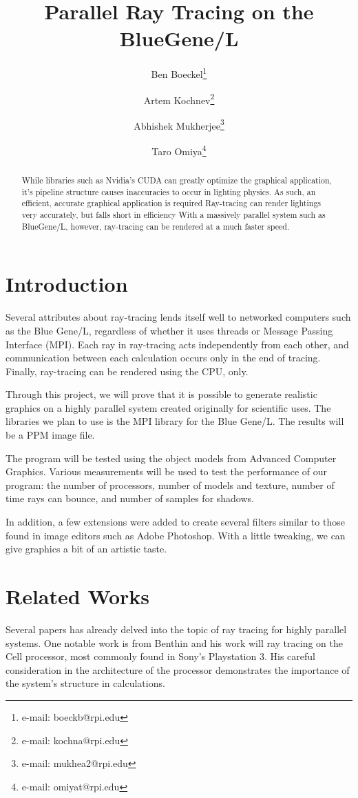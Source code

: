 \documentclass{acmsiggraph}
\title{Parallel Ray Tracing on the BlueGene/L}
\author{%
Ben Boeckel\thanks{e-mail: boeckb@rpi.edu} %
\and Artem Kochnev\thanks{e-mail: kochna@rpi.edu} %
\and Abhishek Mukherjee\thanks{e-mail: mukhea2@rpi.edu} %
\and Taro Omiya\thanks{e-mail: omiyat@rpi.edu}}
\begin{document}
\maketitle


\begin{abstract}
While libraries such as Nvidia's CUDA can greatly optimize the graphical
application, it's pipeline structure causes inaccuracies to occur in lighting
physics.  As such, an efficient, accurate graphical application is required
Ray-tracing can render lightings very accurately, but falls short in efficiency
With a massively parallel system such as BlueGene/L, however, ray-tracing can be
rendered at a much faster speed.
\end{abstract}
\keywordlist


\section{Introduction}
Several attributes about ray-tracing lends itself well to networked computers
such as the Blue Gene/L, regardless of whether it uses threads or Message
Passing Interface (MPI).  Each ray in ray-tracing acts independently from each
other, and communication between each calculation occurs only in the end of
tracing.  Finally, ray-tracing can be rendered using the CPU, only.

Through this project, we will prove that it is possible to generate realistic
graphics on a highly parallel system created originally for scientific uses.
The libraries we plan to use is the MPI library for the Blue Gene/L.
The results will be a PPM image file.

The program will be tested using the object models from Advanced Computer
Graphics.  Various measurements will be used to test the performance of our
program: the number of processors, number of models and texture, number of time
rays can bounce, and number of samples for shadows.

In addition, a few extensions were added to create several filters similar to
those found in image editors such as Adobe Photoshop. With a little tweaking, we
can give graphics a bit of an artistic taste.

\section{Related Works}
Several papers has already delved into the topic of ray tracing for highly
parallel systems.  One notable work is from Benthin and his work will ray
tracing on the Cell processor, most commonly found in Sony's Playstation 3.
His careful consideration in the architecture of the processor demonstrates the
importance of the system's structure in calculations. \cite{benthin2006rtc}
\end{document}
